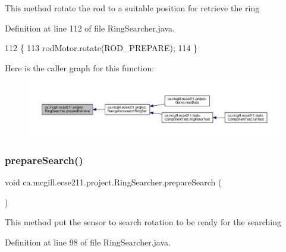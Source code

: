 This method rotate the rod to a suitable position for retrieve the ring 

Definition at line 112 of file Ring\+Searcher.\+java.


\begin{DoxyCode}
112                                 \{
113     rodMotor.rotate(ROD\_PREPARE);
114   \}
\end{DoxyCode}
Here is the caller graph for this function\+:
\nopagebreak
\begin{figure}[H]
\begin{center}
\leavevmode
\includegraphics[width=350pt]{classca_1_1mcgill_1_1ecse211_1_1project_1_1_ring_searcher_a3de30b85b1445157d7f8572992de7651_icgraph}
\end{center}
\end{figure}
\mbox{\label{classca_1_1mcgill_1_1ecse211_1_1project_1_1_ring_searcher_abf31c36cadb144a4651b11f7fa37120a}} 
\subsubsection{\texorpdfstring{prepare\+Search()}{prepareSearch()}}
{\footnotesize\ttfamily void ca.\+mcgill.\+ecse211.\+project.\+Ring\+Searcher.\+prepare\+Search (\begin{DoxyParamCaption}{ }\end{DoxyParamCaption})}

This method put the sensor to search rotation to be ready for the searching 

Definition at line 98 of file Ring\+Searcher.\+java.


